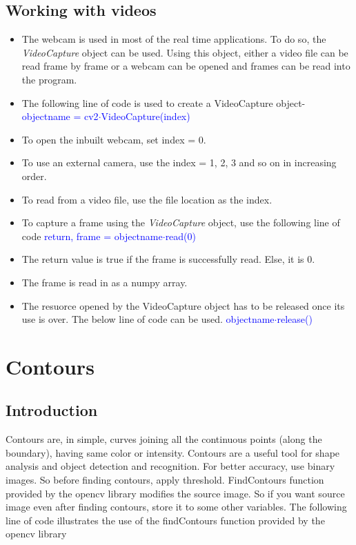 \documentclass[a4paper,12pt]{article}
\begin{document}
\subsection{Working with videos}
\begin{itemize}
 \item The webcam is used in most of the real time applications. To do so, the \emph{VideoCapture} object can be used. Using
 this object, either a video file can be read frame by frame or a webcam can be opened and frames can be read into the program.
 \item The following line of code is used to create a VideoCapture object-
 \newline \textcolor{blue}{object\textunderscore name = cv2$\cdot$VideoCapture(index)}
 \item To open the inbuilt webcam, set index = 0.
 \item To use an external camera, use the index = 1, 2, 3 and so on in increasing order.
 \item To read from a video file, use the file location as the index.
 \item To capture a frame using the \emph{VideoCapture} object, use the following line of code
 \newline \textcolor{blue}{return, frame = object\textunderscore name$\cdot$read(0)}
 \item The return value is true if the frame is successfully read. Else, it is 0.
 \item The frame is read in as a numpy array.
 \item The resuorce opened by the VideoCapture object has to be released once its use is over. The below line of code can be used.
 \newline \textcolor{blue}{object\textunderscore name$\cdot$release()}
\end{itemize}

\newpage
\section{Contours}
\subsection{Introduction}
Contours are, in simple, curves joining all the continuous points (along the boundary), having same color or intensity. Contours 
are a useful tool for shape analysis and object detection and recognition. For better accuracy, use binary images. So before finding
contours, apply threshold. FindContours function provided by the opencv library modifies the source image. So if you want source image
even after finding contours, store it to some other variables. The following line of code illustrates the use of the findContours 
function provided by the opencv library
\vspace{1cm}
\end{document}
